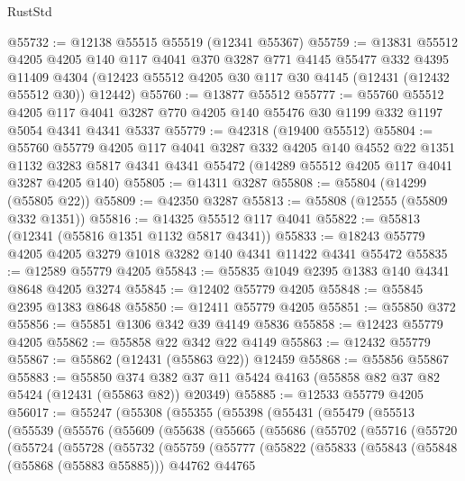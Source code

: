 \begin{lexlean}{RustStd}
\begin{coremodule}
@55732 := @12138 @55515 @55519 (@12341 @55367)
@55759 := @13831
    @55512
    @4205
    @4205
    @140
    @117
    @4041
    @370
    @3287
    @771
    @4145
    @55477
    @332
    @4395
    @11409
    @4304
    (@12423 @55512 @4205 @30 @117 @30 @4145 (@12431 (@12432 @55512 @30)) @12442)
@55760 := @13877 @55512
@55777 := @55760
    @55512
    @4205
    @117
    @4041
    @3287
    @770
    @4205
    @140
    @55476
    @30
    @1199
    @332
    @1197
    @5054
    @4341
    @4341
    @5337
@55779 := @42318 (@19400 @55512)
@55804 := @55760
    @55779
    @4205
    @117
    @4041
    @3287
    @332
    @4205
    @140
    @4552
    @22
    @1351
    @1132
    @3283
    @5817
    @4341
    @4341
    @55472
    (@14289 @55512 @4205 @117 @4041 @3287 @4205 @140)
@55805 := @14311 @3287
@55808 := @55804 (@14299 (@55805 @22))
@55809 := @42350 @3287
@55813 := @55808 (@12555 (@55809 @332 @1351))
@55816 := @14325 @55512 @117 @4041
@55822 := @55813 (@12341 (@55816 @1351 @1132 @5817 @4341))
@55833 := @18243 @55779 @4205 @4205 @3279 @1018 @3282 @140 @4341 @11422 @4341 @55472
@55835 := @12589 @55779 @4205
@55843 := @55835 @1049 @2395 @1383 @140 @4341 @8648 @4205 @3274
@55845 := @12402 @55779 @4205
@55848 := @55845 @2395 @1383 @8648
@55850 := @12411 @55779 @4205
@55851 := @55850 @372
@55856 := @55851 @1306 @342 @39 @4149 @5836
@55858 := @12423 @55779 @4205
@55862 := @55858 @22 @342 @22 @4149
@55863 := @12432 @55779
@55867 := @55862 (@12431 (@55863 @22)) @12459
@55868 := @55856 @55867
@55883 := @55850
    @374
    @382
    @37
    @11
    @5424
    @4163
    (@55858 @82 @37 @82 @5424 (@12431 (@55863 @82)) @20349)
@55885 := @12533 @55779 @4205
@56017 := @55247
    (@55308
      (@55355
        (@55398
          (@55431
            (@55479
              (@55513
                (@55539
                  (@55576
                    (@55609
                      (@55638
                        (@55665
                          (@55686
                            (@55702
                              (@55716
                                (@55720
                                  (@55724
                                    (@55728
                                      (@55732
                                        (@55759
                                          (@55777
                                            (@55822
                                              (@55833
                                                (@55843
                                                  (@55848 (@55868 (@55883 @55885)))
                                                  @44762
                                                  @44765

\end{coremodule}
\end{lexlean}
